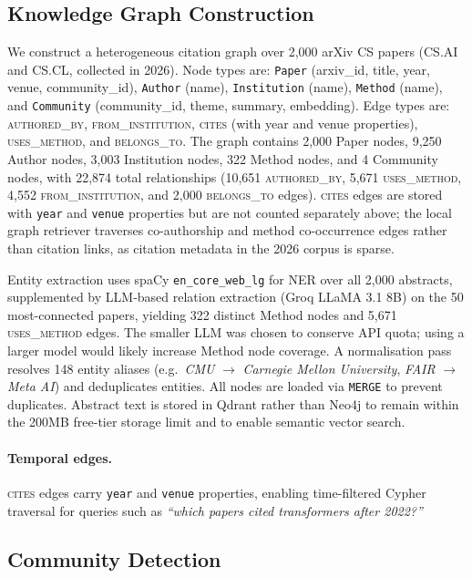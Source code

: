 \documentclass[11pt]{article}
\begin{document}
\subsection{Knowledge Graph Construction}
\label{subsec:graph}

We construct a heterogeneous citation graph over 2,000 arXiv CS papers
(CS.AI and CS.CL, collected in 2026). Node types are: \texttt{Paper}
(arxiv\_id, title, year, venue, community\_id), \texttt{Author} (name),
\texttt{Institution} (name), \texttt{Method} (name), and
\texttt{Community} (community\_id, theme, summary, embedding). Edge types
are: \textsc{authored\_by}, \textsc{from\_institution},
\textsc{cites} (with year and venue properties), \textsc{uses\_method},
and \textsc{belongs\_to}. The graph contains 2,000 Paper nodes, 9,250
Author nodes, 3,003 Institution nodes, 322 Method nodes, and 4 Community
nodes, with 22,874 total relationships (10,651 \textsc{authored\_by},
5,671 \textsc{uses\_method}, 4,552 \textsc{from\_institution}, and 2,000
\textsc{belongs\_to} edges). \textsc{cites} edges are stored with
\texttt{year} and \texttt{venue} properties but are not counted separately
above; the local graph retriever traverses co-authorship and method
co-occurrence edges rather than citation links, as citation metadata in
the 2026 corpus is sparse.

Entity extraction uses spaCy \texttt{en\_core\_web\_lg} for NER over all
2,000 abstracts, supplemented by LLM-based relation extraction (Groq
LLaMA 3.1 8B) on the 50 most-connected papers, yielding 322 distinct
Method nodes and 5,671 \textsc{uses\_method} edges. The smaller LLM was
chosen to conserve API quota; using a larger model would likely increase
Method node coverage. A normalisation pass resolves 148 entity aliases
(e.g.\ \textit{CMU} $\to$ \textit{Carnegie Mellon University},
\textit{FAIR} $\to$ \textit{Meta AI}) and deduplicates entities. All
nodes are loaded via \texttt{MERGE} to prevent duplicates. Abstract text
is stored in Qdrant rather than Neo4j to remain within the 200MB
free-tier storage limit and to enable semantic vector search.

\paragraph{Temporal edges.}
\textsc{cites} edges carry \texttt{year} and \texttt{venue} properties,
enabling time-filtered Cypher traversal for queries such as
\textit{``which papers cited transformers after 2022?''}

\subsection{Community Detection}
\label{subsec:community}
\end{document}
